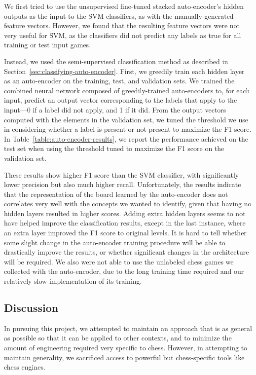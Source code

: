 \documentclass[11pt]{article}
\begin{document}
We first tried to use the unsupervised fine-tuned stacked auto-encoder's hidden outputs as the input to the SVM classifiers, as with the manually-generated feature vectors. However, we found that the resulting feature vectors were not very useful for SVM, as the classifiers did not predict any labels as true for all training or test input games.

Instead, we used the semi-supervised classification method as described in Section~\ref{sec:classifying-auto-encoder}. First, we greedily train each hidden layer as an auto-encoder on the training, test, and validation sets. We trained the combined neural network composed of greedily-trained auto-encoders to, for each input, predict an output vector corresponding to the labels that apply to the input---0 if a label did not apply, and 1 if it did. From the output vectors computed with the elements in the validation set, we tuned the threshold we use in considering whether a label is present or not present to maximize the F1 score. In Table~\ref{table:auto-encoder-results}, we report the performance achieved on the test set when using the threshold tuned to maximize the F1 score on the validation set.

These results show higher F1 score than the SVM classifier, with significantly lower precision but also much higher recall. Unfortunately, the results indicate that the representation of the board learned by the auto-encoder does not correlates very well with the concepts we wanted to identify, given that having no hidden layers resulted in higher scores. Adding extra hidden layers seems to not have helped improve the classification results, except in the last instance, where an extra layer improved the F1 score to original levels. It is hard to tell whether some slight change in the auto-encoder training procedure will be able to drastically improve the results, or whether significant changes in the architecture will be required. We also were not able to use the unlabeled chess games we collected with the auto-encoder, due to the long training time required and our relatively slow implementation of its training.

\subsection{Discussion}
In pursuing this project, we attempted to maintain an approach that is as general as possible so that it can be applied to other contexts, and to minimize the amount of engineering required very specific to chess. However, in attempting to maintain generality, we sacrificed access to powerful but chess-specific tools like chess engines.%
\end{document}
